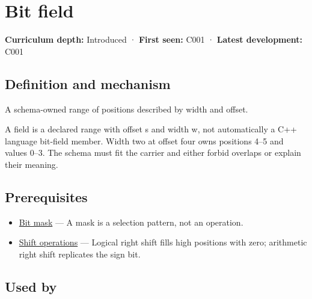 \hypertarget{appendix-ac697f5c66e8}{}\label{referencestart:appendix-ac697f5c66e8}
\section{Bit field}\label{appendix-ac697f5c66e8-bit-field}

\hypertarget{appendix-ac697f5c66e8-bit-field}{}

\textbf{Curriculum depth:} Introduced · \textbf{First seen:} C001 · \textbf{Latest development:} C001

\begin{allmightroledefinition}

\subsection{Definition and mechanism}\label{appendix-ac697f5c66e8-definition-and-mechanism}

\hypertarget{appendix-ac697f5c66e8-definition-and-mechanism}{}

A schema-owned range of positions described by width and offset.

\end{allmightroledefinition}

A field is a declared range with offset s and width w, not automatically a C++ language bit-field member. Width two at offset four owns positions 4--5 and values 0--3. The schema must fit the carrier and either forbid overlaps or explain their meaning.

\subsection{Prerequisites}\label{appendix-ac697f5c66e8-prerequisites}

\hypertarget{appendix-ac697f5c66e8-prerequisites}{}

\begin{itemize}
\tightlist
\item
  \hyperref[appendix-dbe5905163c2]{Bit mask} --- A mask is a selection pattern, not an operation.
\item
  \hyperref[appendix-73425b25118e]{Shift operations} --- Logical right shift fills high positions with zero; arithmetic right shift replicates the sign bit.
\end{itemize}

\subsection{Used by}\label{appendix-ac697f5c66e8-used-by}

